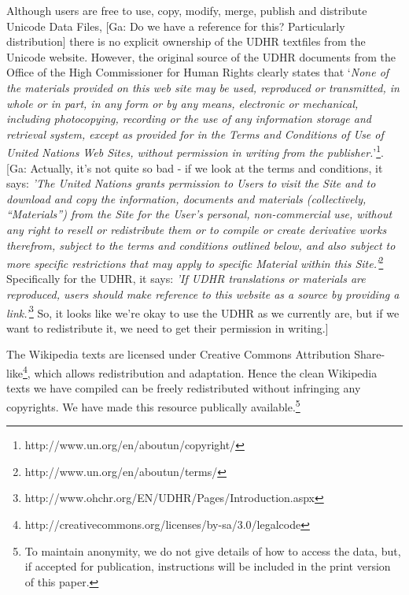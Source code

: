 \documentclass[11pt]{article}
\begin{document}
Although users are free to use, copy, modify, merge, publish and distribute Unicode Data Files, [Ga: Do we have a reference for this? Particularly distribution] there is no explicit ownership of the UDHR textfiles from the Unicode website. However, the original source of the UDHR documents from the Office of the High Commissioner for Human Rights clearly states that `\emph{None of the materials provided on this web site may be used, reproduced or transmitted, in whole or in part, in any form or by any means, electronic or mechanical, including photocopying, recording or the use of any information storage and retrieval system, except as provided for in the Terms and Conditions of Use of United Nations Web Sites, without permission in writing from the publisher.}'\footnote{http://www.un.org/en/aboutun/copyright/}. [Ga: Actually, it's not quite so bad - if we look at the terms and conditions, it says: \emph{'The United Nations grants permission to Users to visit the Site and to download and copy the information, documents and materials (collectively, “Materials”) from the Site for the User’s personal, non-commercial use, without any right to resell or redistribute them or to compile or create derivative works therefrom, subject to the terms and conditions outlined below, and also subject to more specific restrictions that may apply to specific Material within this Site.'}\footnote{http://www.un.org/en/aboutun/terms/} Specifically for the UDHR, it says: \emph{'If UDHR translations or materials are reproduced, users should make reference to this website as a source by providing a link.'}\footnote{http://www.ohchr.org/EN/UDHR/Pages/Introduction.aspx}  So, it looks like we're okay to use the UDHR as we currently are, but if we want to redistribute it, we need to get their permission in writing.]

The Wikipedia texts are licensed under Creative Commons Attribution Share-like\footnote{http://creativecommons.org/licenses/by-sa/3.0/legalcode}, which allows redistribution and adaptation. Hence the clean Wikipedia texts we have compiled can be freely redistributed without infringing any copyrights.  We have made this resource publically available.\footnote{To maintain anonymity, we do not give details of how to access the data, but, if accepted for publication, instructions will be included in the print version of this paper.}

\end{document}
